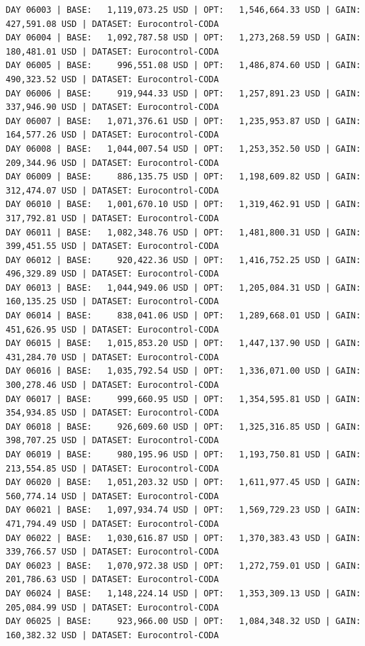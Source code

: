 \documentclass[11pt,a4paper]{article}
\begin{document}
\begin{verbatim}
DAY 06003 | BASE:   1,119,073.25 USD | OPT:   1,546,664.33 USD | GAIN: 427,591.08 USD | DATASET: Eurocontrol-CODA
DAY 06004 | BASE:   1,092,787.58 USD | OPT:   1,273,268.59 USD | GAIN: 180,481.01 USD | DATASET: Eurocontrol-CODA
DAY 06005 | BASE:     996,551.08 USD | OPT:   1,486,874.60 USD | GAIN: 490,323.52 USD | DATASET: Eurocontrol-CODA
DAY 06006 | BASE:     919,944.33 USD | OPT:   1,257,891.23 USD | GAIN: 337,946.90 USD | DATASET: Eurocontrol-CODA
DAY 06007 | BASE:   1,071,376.61 USD | OPT:   1,235,953.87 USD | GAIN: 164,577.26 USD | DATASET: Eurocontrol-CODA
DAY 06008 | BASE:   1,044,007.54 USD | OPT:   1,253,352.50 USD | GAIN: 209,344.96 USD | DATASET: Eurocontrol-CODA
DAY 06009 | BASE:     886,135.75 USD | OPT:   1,198,609.82 USD | GAIN: 312,474.07 USD | DATASET: Eurocontrol-CODA
DAY 06010 | BASE:   1,001,670.10 USD | OPT:   1,319,462.91 USD | GAIN: 317,792.81 USD | DATASET: Eurocontrol-CODA
DAY 06011 | BASE:   1,082,348.76 USD | OPT:   1,481,800.31 USD | GAIN: 399,451.55 USD | DATASET: Eurocontrol-CODA
DAY 06012 | BASE:     920,422.36 USD | OPT:   1,416,752.25 USD | GAIN: 496,329.89 USD | DATASET: Eurocontrol-CODA
DAY 06013 | BASE:   1,044,949.06 USD | OPT:   1,205,084.31 USD | GAIN: 160,135.25 USD | DATASET: Eurocontrol-CODA
DAY 06014 | BASE:     838,041.06 USD | OPT:   1,289,668.01 USD | GAIN: 451,626.95 USD | DATASET: Eurocontrol-CODA
DAY 06015 | BASE:   1,015,853.20 USD | OPT:   1,447,137.90 USD | GAIN: 431,284.70 USD | DATASET: Eurocontrol-CODA
DAY 06016 | BASE:   1,035,792.54 USD | OPT:   1,336,071.00 USD | GAIN: 300,278.46 USD | DATASET: Eurocontrol-CODA
DAY 06017 | BASE:     999,660.95 USD | OPT:   1,354,595.81 USD | GAIN: 354,934.85 USD | DATASET: Eurocontrol-CODA
DAY 06018 | BASE:     926,609.60 USD | OPT:   1,325,316.85 USD | GAIN: 398,707.25 USD | DATASET: Eurocontrol-CODA
DAY 06019 | BASE:     980,195.96 USD | OPT:   1,193,750.81 USD | GAIN: 213,554.85 USD | DATASET: Eurocontrol-CODA
DAY 06020 | BASE:   1,051,203.32 USD | OPT:   1,611,977.45 USD | GAIN: 560,774.14 USD | DATASET: Eurocontrol-CODA
DAY 06021 | BASE:   1,097,934.74 USD | OPT:   1,569,729.23 USD | GAIN: 471,794.49 USD | DATASET: Eurocontrol-CODA
DAY 06022 | BASE:   1,030,616.87 USD | OPT:   1,370,383.43 USD | GAIN: 339,766.57 USD | DATASET: Eurocontrol-CODA
DAY 06023 | BASE:   1,070,972.38 USD | OPT:   1,272,759.01 USD | GAIN: 201,786.63 USD | DATASET: Eurocontrol-CODA
DAY 06024 | BASE:   1,148,224.14 USD | OPT:   1,353,309.13 USD | GAIN: 205,084.99 USD | DATASET: Eurocontrol-CODA
DAY 06025 | BASE:     923,966.00 USD | OPT:   1,084,348.32 USD | GAIN: 160,382.32 USD | DATASET: Eurocontrol-CODA

\end{verbatim}
\end{document}
